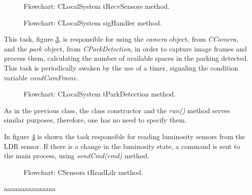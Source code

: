 \begin{figure}[H]
	\centering
	\caption{Flowchart: CLocalSystem tRecvSensors method.}
	\label{fig:CLocalSystemtRecvSensors}
\end{figure}

\begin{figure}[H]
	\centering
	\caption{Flowchart: CLocalSystem sigHandler method.}
	\label{fig:CLocalSystemsigHandler}
\end{figure}

This task, figure \ref{fig:CLocalSystemtParkDetection}, is responsible for using the \textit{camera} object, from \textit{CCamera}, and the \textit{park} object, from \textit{CParkDetection}, in order to capture image frames and process them, calculating the number of available spaces in the parking detected. This task is periodically awaken by the use of a timer, signaling the condition variable \textit{condCamFrame}.

\begin{figure}[H]
	\centering
	\caption{Flowchart: CLocalSystem tParkDetection method.}
	\label{fig:CLocalSystemtParkDetection}
\end{figure}

\clearpage
{}

As in the previous class, the class constructor and the \textit{run()} method serves similar purposes, therefore, one has no need to specify them.\linebreak

In figure \ref{fig:CSensorstreadldr} is shown the task responsible for reading luminosity sensors from the LDR sensor. If there is a change in the luminosity state, a command is sent to the main process, using \textit{sendCmd(cmd)} method.

\begin{figure}[H]
	\centering
	\caption{Flowchart: CSensors tReadLdr method.}
	\label{fig:CSensorstreadldr}
\end{figure}

aaaaaaaaaaaaaaa

